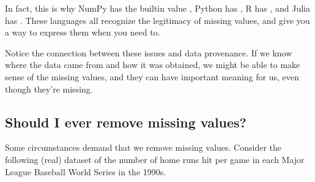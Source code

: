 \documentclass[letterpaper,10pt,english]{sphinxmanual}
\begin{document}
In fact, this is why NumPy has the built\sphinxhyphen{}in value , Python has , R has , and Julia has .  These languages all recognize the legitimacy of missing values, and give you a way to express them when you need to.

Notice the connection between these issues and data provenance.  If we know where the data came from and how it was obtained, we might be able to make sense of the missing values, and they can have important meaning for us, even though they’re missing.


\subsection{Should I ever remove missing values?}
\label{\detokenize{chapter-13-etl:should-i-ever-remove-missing-values}}

Some circumstances demand that we remove missing values.  Consider the following (real) dataset of the number of home runs hit per game in each Major League Baseball World Series in the 1990s.

\begin{sphinxVerbatim}[commandchars=\\\{\}]
   
   
   
      \PYG{p}{[}           \PYG{p}{]}
      \PYG{p}{[}           \PYG{p}{]}
      \PYG{p}{[}           \PYG{p}{]}
 
\PYG{p}{[}\PYG{p}{]}  \PYG{p}{[}\PYG{p}{]}  \PYG{p}{[}\PYG{p}{]}
\end{sphinxVerbatim}
\end{document}
